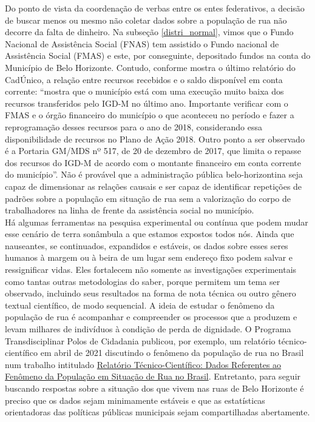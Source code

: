 \documentclass[12pt]{article}
\begin{document}
Do ponto de vista da coordenação de verbas entre os entes federativos, a decisão de buscar menos ou mesmo não coletar dados sobre a população de rua não decorre da falta de dinheiro. Na subseção \ref{distri_normal}, vimos que o Fundo Nacional de Assistência Social (FNAS) tem assistido o Fundo nacional de Assistência Social (FMAS) e este, por conseguinte, depositado fundos na conta do Município de Belo Horizonte. Contudo, conforme mostra o último relatório do CadÚnico, a relação entre recursos recebidos e o saldo disponível em conta corrente: ``mostra que o município está com uma execução muito baixa dos recursos transferidos pelo IGD-M no último ano. Importante verificar com o FMAS e o órgão financeiro do município o que aconteceu no período e fazer a reprogramação desses recursos para o ano de 2018, considerando essa disponibilidade de recursos no Plano de Ação 2018. Outro ponto a ser observado é a Portaria GM/MDS nº 517, de 20 de dezembro de 2017, que limita o repasse dos recursos do IGD-M de acordo com o montante financeiro em conta corrente do município''. Não é provável que a administração pública belo-horizontina seja capaz de dimensionar as relações causais e ser capaz de identificar repetições de padrões sobre a população em situação de rua sem a valorização do corpo de trabalhadores na linha de frente da assistência social no município.\\

Há algumas ferramentas na pesquisa experimental ou contínua que podem mudar esse cenário de terra sonâmbula a que estamos expostos todos nós. Ainda que nauseantes, se continuados, expandidos e estáveis, os dados sobre esses seres humanos à margem ou à beira de um lugar sem endereço fixo podem salvar e ressignificar vidas. Eles fortalecem não somente as investigações experimentais como tantas outras metodologias do saber, porque permitem um tema ser observado, incluindo seus resultados na forma de nota técnica ou outro gênero textual científico, de modo sequencial. A ideia de estudar o fenômeno da população de rua é acompanhar e compreender os processos que a produzem e levam milhares de indivíduos à condição de perda de dignidade. O Programa Transdisciplinar Polos de Cidadania publicou, por exemplo, um relatório técnico-científico em abril de 2021 discutindo o fenômeno da população de rua no Brasil num trabalho intitulado \href{https://ufmg.br/comunicacao/assessoria-de-imprensa/release/relatorio-do-programa-polos-de-cidadania-da-ufmg-ajuda-a-corrigir-plano-de-imunizacao-da-populacao-de-rua}{Relatório Técnico-Científico: Dados Referentes ao Fenômeno da População em Situação de Rua no Brasil}. Entretanto, para seguir buscando respostas sobre a situação dos que vivem nas ruas de Belo Horizonte é preciso que os dados sejam minimamente estáveis e que as estatísticas orientadoras das políticas públicas municipais sejam compartilhadas abertamente.\\ 
\end{document}

